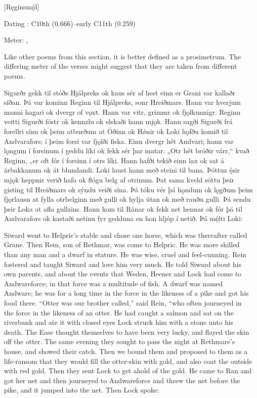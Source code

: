 [Ręginsmǫ́l]

\begin{flushright}%
Dating \parencite{Sapp2022}: C10th (0.666)–early C11th (0.259)

Meter: \Ljodahattr, \Fornyrdislag%
\end{flushright}

Like other poems from this section, it is better defined as a prosimetrum. The differing meter of the verses might suggest that they are taken from different poems.

\sectionline

\bpg\bpa Sigurðr gekk til stóðs Hjálpreks ok kaus sér af hest einn er Grani var kallaðr síðan. Þá var kominn Reginn til Hjálpreks, sonr Hreiðmars. Hann var hverjum manni hagari ok dvergr of vǫxt. Hann var vitr, grimmr ok fjǫlkunnigr. Reginn veitti Sigurði fóstr ok kennzlu ok elskaði hann mjǫk. Hann sagði Sigurði frá forellri sínu ok þeim atburðum at Óðinn ok Hǿnir ok Loki hǫfðu komið til Andvarafors; í þeim forsi var fjǫlði fiska. Einn dvergr hét Andvari; hann var lǫngum í forsinum í geddu líki ok fekk sér þar matar. „Otr hét bróðir várr,“ kvað Reginn, „er oft fór í forsinn í otrs líki. Hann hafði tekið einn lax ok sat á árbakkanum ok át blundandi. Loki laust hann með steini til bana. Þóttuz ę́sir mjǫk heppnir verið hafa ok flógu belg af otrinum. Þat sama kveld sóttu þeir gisting til Hreiðmars ok sýndu veiði sína. Þá tóku vér þá hǫndum ok lǫgðum þeim fjǫrlausn at fylla otrbelginn með gulli ok hylja útan ok með rauðu gulli. Þá sendu þeir Loka at afla gullzins. Hann kom til Ránar ok fekk net hennar ok fór þá til Andvarafors ok kastaði netinu fyr gedduna en hon hljóp í netið. Þá mę́lti Loki:\epa

\bpb Siward went to Helpric’s stable and chose one horse, which was thereafter called Grane. Then Rein, son of Rethmar, was come to Helpric. He was more skilled than any man and a dwarf in stature. He was wise, cruel and feel-cunning. Rein fostered and taught Siward and love him very much. He told Siward about his own parents, and about the events that Weden, Heener and Lock had come to Andwareforce; in that force was a multitude of fish. A dwarf was named Andware; he was for a long time in the force in the likeness of a pike and got his food there. “Otter was our brother called,” said Rein, “who often journeyed in the force in the likeness of an otter. He had caught a salmon and sat on the riverbank and ate it with closed eyes Lock struck him with a stone unto his death. The Ease thought themselves to have been very lucky, and flayed the skin off the otter. The same evening they sought to pass the night at Rethmare’s house, and showed their catch. Then we bound them and proposed to them as a life-ransom that they would fill the otter-skin with gold, and also coat the outside with red gold. Then they sent Lock to get ahold of the gold. He came to Ran and got her net and then journeyed to Andwareforce and threw the net before the pike, and it jumped into the net. Then Lock spoke:\epb\epg


